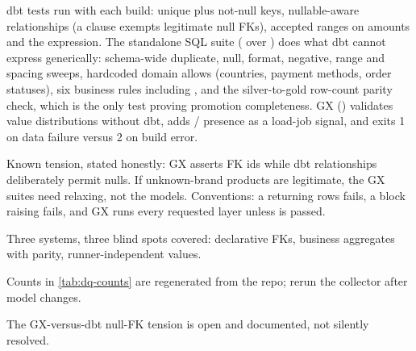 dbt  tests run with each build: unique plus not-null keys, nullable-aware relationships (a  clause exempts legitimate null FKs), accepted ranges on amounts and the  expression. The standalone SQL suite ( over ) does what dbt cannot express generically: schema-wide duplicate, null, format, negative, range and spacing sweeps, hardcoded domain allows (countries, payment methods, order statuses), six business rules including , and the silver-to-gold row-count parity check, which is the only test proving promotion completeness. GX () validates value distributions without dbt, adds / presence as a load-job signal, and exits 1 on data failure versus 2 on build error.

Known tension, stated honestly: GX asserts FK ids  while dbt relationships deliberately permit nulls. If unknown-brand products are legitimate, the GX suites need relaxing, not the models. Conventions: a  returning rows fails, a  block raising fails, and GX runs every requested layer unless  is passed.

\begin{keybox}
\item Three systems, three blind spots covered: declarative FKs, business aggregates with parity, runner-independent values.
\item Counts in \cref{tab:dq-counts} are regenerated from the repo; rerun the collector after model changes.
\item The GX-versus-dbt null-FK tension is open and documented, not silently resolved.
\end{keybox}

